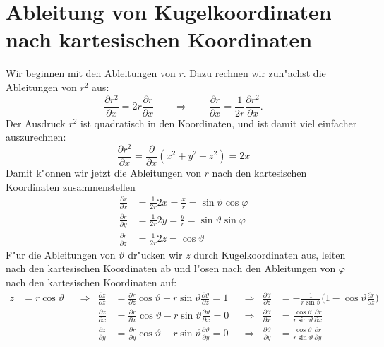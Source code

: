 \section{Ableitung von Kugelkoordinaten nach kartesischen Koordinaten}
Wir beginnen mit den Ableitungen von $r$. Dazu rechnen wir zun"achst die
Ableitungen von $r^2$ aus:
\[
\frac{\partial r^2}{\partial x}
=
2r\frac{\partial r}{\partial x}
\qquad
\Rightarrow
\qquad
\frac{\partial r}{\partial x}
=
\frac1{2r}\frac{\partial r^2}{\partial x}.
\]
Der Ausdruck  $r^2$ ist quadratisch in den Koordinaten, und ist damit
viel einfacher auszurechnen:
\[
\frac{\partial r^2}{\partial x}=\frac{\partial}{\partial x}(x^2+y^2+z^2)=2x
\]
Damit k"onnen wir jetzt die Ableitungen von $r$ nach den kartesischen
Koordinaten zusammenstellen
\begin{equation}
\begin{aligned}
\frac{\partial r}{\partial x}
&=
\frac1{2r}2x=\frac{x}{r}=\sin\vartheta\cos\varphi
\\
\frac{\partial r}{\partial y}
&=
\frac1{2r}2y=\frac{y}{r}=\sin\vartheta\sin\varphi
\\
\frac{\partial r}{\partial z}
&=
\frac1{2r}2z=\cos\vartheta
\end{aligned}
\label{ableitungenvonr}
\end{equation}
F"ur die Ableitungen von $\vartheta$ dr"ucken wir $z$ durch Kugelkoordinaten
aus, leiten nach den kartesischen Koordinaten ab und l"osen nach den
Ableitungen von $\varphi$ nach den kartesischen Koordinaten auf:
\begin{align*}
z&=r\cos\vartheta
&&\Rightarrow&
\frac{\partial z}{\partial z}
&=
\frac{\partial r}{\partial z}\cos\vartheta
-
r \sin\vartheta\frac{\partial \vartheta}{\partial z}
=1
&&\Rightarrow&
\frac{\partial\vartheta}{\partial z}
&=
-\frac1{r\sin\vartheta}
\biggl(1-\cos\vartheta\frac{\partial r}{\partial z}\biggr)
\\
&&&&
\frac{\partial z}{\partial x}
&=
\frac{\partial r}{\partial x}\cos\vartheta
	- r\sin\vartheta\frac{\partial\vartheta}{\partial x}
=0
&&\Rightarrow&
\frac{\partial\vartheta}{\partial x}
&=
\frac{\cos\vartheta}{r\sin\vartheta}\frac{\partial r}{\partial x}
\\
&&&&
\frac{\partial z}{\partial y}
&=
\frac{\partial r}{\partial y}\cos\vartheta
	- r\sin\vartheta\frac{\partial\vartheta}{\partial y}
=0
&&\Rightarrow&
\frac{\partial\vartheta}{\partial y}
&=
\frac{\cos\vartheta}{r\sin\vartheta}\frac{\partial r}{\partial y}
\end{align*}
